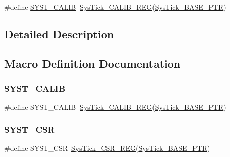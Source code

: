 \begin{DoxyCompactItemize}
\item 
\#define \hyperlink{group___sys_tick___register___accessor___macros_ga2d37582dd39f59744e340cce09230250}{S\+Y\+S\+T\+\_\+\+C\+A\+L\+IB}~\hyperlink{group___sys_tick___register___accessor___macros_ga49a5f3af22dff7288ad031b8b3bf1b7a}{Sys\+Tick\+\_\+\+C\+A\+L\+I\+B\+\_\+\+R\+EG}(\hyperlink{group___sys_tick___peripheral_gaeef73642fdef722ce658e468dad877ea}{Sys\+Tick\+\_\+\+B\+A\+S\+E\+\_\+\+P\+TR})
\end{DoxyCompactItemize}


\subsection{Detailed Description}


\subsection{Macro Definition Documentation}
\mbox{\label{group___sys_tick___register___accessor___macros_ga2d37582dd39f59744e340cce09230250}} 
\subsubsection{\texorpdfstring{S\+Y\+S\+T\+\_\+\+C\+A\+L\+IB}{SYST\_CALIB}}
{\footnotesize\ttfamily \#define S\+Y\+S\+T\+\_\+\+C\+A\+L\+IB~\hyperlink{group___sys_tick___register___accessor___macros_ga49a5f3af22dff7288ad031b8b3bf1b7a}{Sys\+Tick\+\_\+\+C\+A\+L\+I\+B\+\_\+\+R\+EG}(\hyperlink{group___sys_tick___peripheral_gaeef73642fdef722ce658e468dad877ea}{Sys\+Tick\+\_\+\+B\+A\+S\+E\+\_\+\+P\+TR})}

\mbox{\label{group___sys_tick___register___accessor___macros_gab26b3fc75982181f81b185b206e897f6}} 
\subsubsection{\texorpdfstring{S\+Y\+S\+T\+\_\+\+C\+SR}{SYST\_CSR}}
{\footnotesize\ttfamily \#define S\+Y\+S\+T\+\_\+\+C\+SR~\hyperlink{group___sys_tick___register___accessor___macros_gaf55a190fd4086e13691f11a798185b64}{Sys\+Tick\+\_\+\+C\+S\+R\+\_\+\+R\+EG}(\hyperlink{group___sys_tick___peripheral_gaeef73642fdef722ce658e468dad877ea}{Sys\+Tick\+\_\+\+B\+A\+S\+E\+\_\+\+P\+TR})}

